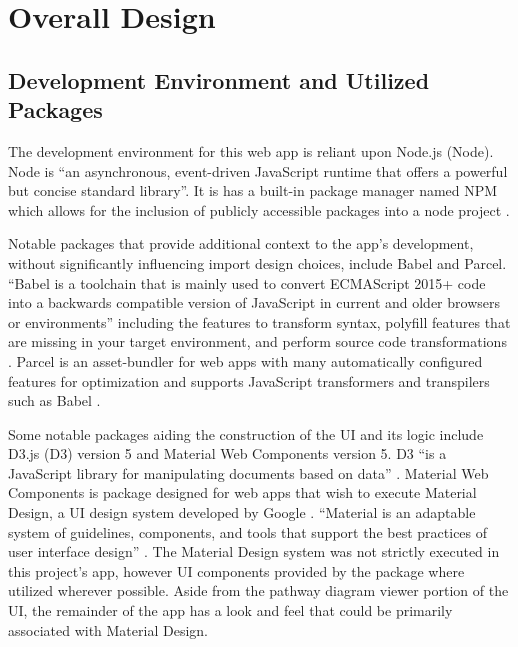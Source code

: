 \documentclass[12pt]{report}
\begin{document}
\chapter{Overall Design}
\section {Development Environment and Utilized Packages}
The development environment for this web app is reliant upon Node.js (Node). Node is ``an asynchronous, event-driven JavaScript runtime that offers a powerful but concise standard library''. It is has a built-in package manager named NPM which allows for the inclusion of publicly accessible packages into a node project \cite{NodeJSInAction}.

Notable packages that provide additional context to the app's development, without significantly influencing import design choices, include Babel and Parcel. ``Babel is a toolchain that is mainly used to convert ECMAScript 2015+ code into a backwards compatible version of JavaScript in current and older browsers or environments'' including the features to transform syntax, polyfill features that are missing in your target environment, and perform source code transformations \cite {BabelDocumentation}. Parcel is an asset-bundler for web apps with many automatically configured features for optimization and supports JavaScript transformers and transpilers such as Babel \cite{ParcelDocumentation}.

Some notable packages aiding the construction of the UI and its logic include D3.js (D3) version 5 and Material Web Components version 5. D3 ``is a JavaScript library for manipulating documents based on data'' \cite{D3HomePage}. Material Web Components is package designed for web apps that wish to execute Material Design, a UI design system developed by Google \cite{MaterialComponentsWebGithub}. ``Material is an adaptable system of guidelines, components, and tools that support the best practices of user interface design'' \cite{MaterialDesignPhilosophy}. The Material Design system was not strictly executed in this project's app, however UI components provided by the package where utilized wherever possible. Aside from the pathway diagram viewer portion of the UI, the remainder of the app has a look and feel that could be primarily associated with Material Design.
\end{document}
